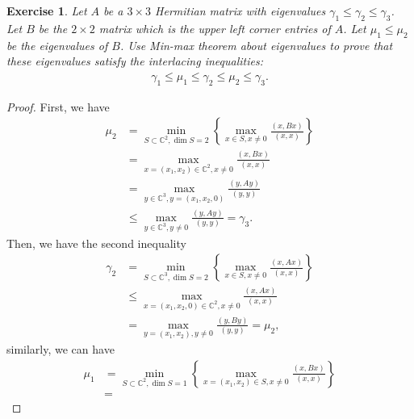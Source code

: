 \documentclass[11pt]{article}
\newtheorem{exercise}{Exercise}[section]
\theoremstyle{definition}
\numberwithin{equation}{subsection}
\begin{document}
\begin{exercise}
Let $A$ be a $3 \times 3$ Hermitian matrix with eigenvalues $\gamma_1 \leq \gamma_2 \leq \gamma_3$. Let $B$ be the $2 \times 2$ matrix which is the upper left corner entries of $A$. Let $\mu_1 \leq \mu_2$ be the eigenvalues of $B$. Use Min-max theorem about eigenvalues to prove that these eigenvalues satisfy the interlacing inequalities:
\begin{align*}
    \gamma_1 \leq \mu_1 \leq \gamma_2 \leq \mu_2 \leq \gamma_3.
\end{align*}
\end{exercise}
\begin{proof}
First, we have
\begin{align*}
    \mu_2 & = \min_{S \subset \mathbb{C}^2, \dim S = 2} \left\{\max_{x \in S, x \neq 0} \frac{(x, Bx)}{(x,x)} \right\} \\
    & = \max_{x =(x_1, x_2) \in \mathbb{C}^2, x \neq 0} \frac{(x, Bx)}{(x,x)} \\
    & = \max_{y \in \mathbb{C}^3, y = (x_1, x_2, 0)} \frac{(y, Ay)}{(y,y)} \\
    & \leq \max_{y \in \mathbb{C}^3, y \neq 0} \frac{(y, Ay)}{(y,y)} = \gamma_3.
\end{align*}
Then, we have the second inequality 
\begin{align*}
    \gamma_2 & = \min_{S \subset \mathbb{C}^3, \dim S = 2} \left\{\max_{x \in S, x \neq 0} \frac{(x, Ax)}{(x,x)} \right\}\\
    & \leq \max_{x = (x_1, x_2, 0) \in \mathbb{C}^2, x \neq 0} \frac{(x, Ax)}{(x,x)} \\
    & = \max_{y = (x_1, x_2), y \neq 0} \frac{(y, By)}{(y, y)} = \mu_2,
\end{align*}
similarly, we can have 
\begin{align*}
    \mu_1 & = \min_{S \subset \mathbb{C}^2, \dim S = 1} \left\{\max_{x = (x_1, x_2) \in S, x \neq 0} \frac{(x, Bx)}{(x,x)} \right\} \\
    & = 
\end{align*}
\end{proof}









\newpage


\end{document}
